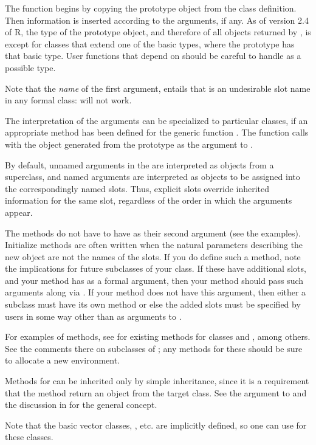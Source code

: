 \begin{Details}\relax
The function  begins by copying the prototype object from
the class definition.  Then information is inserted according to the
 arguments, if any.  As of version 2.4 of R, the type of
the prototype object, and therefore of all objects returned by
, is  except for classes that extend
one of the basic types, where the prototype has that basic type.  User
functions that depend on  should be
careful to handle  as a possible type.

Note that the \emph{name} of the first argument, 
entails that  is an undesirable slot name in any formal
class:  will not work.

The interpretation of the  arguments can be specialized to
particular classes, if an appropriate method has been defined for the
generic function .  The  function calls
 with the object generated from the prototype as the
 argument to .

By default, unnamed arguments in the  are interpreted as
objects from a superclass, and named arguments are interpreted as
objects to be assigned into the correspondingly named slots.  Thus,
explicit slots override inherited information for the same slot,
regardless of the order in which the arguments appear.

The  methods do not have to have  as
their second argument (see the examples).  Initialize methods are
often written when the natural parameters describing the new object
are not the names of the slots.  If you do define such a method,
note the implications for future subclasses of your class.  If these
have additional slots, and your  method has
 as a formal argument, then your method should pass such
arguments along via .  If your method
does not have this argument, then either a subclass must have its
own method or else the added slots must be specified by users in
some way other than as arguments to .

For examples of  methods, see
 for existing methods for
classes  and , among
others. See the comments there on subclasses of
; any  methods for these should
be sure to allocate a new environment.

Methods for  can be inherited only by simple
inheritance, since it is a requirement that the method return an
object from the target class.  See the
 argument to  and
the discussion in  for the general concept.

Note that the basic vector classes, , etc. are
implicitly defined, so one can use  for these classes.
\end{Details}
